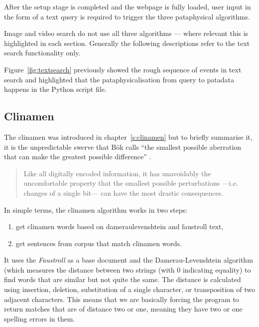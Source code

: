 After the setup stage is completed and the webpage is fully loaded, user input in the form of a text query is required to trigger the three pataphysical algorithms.

Image and video search do not use all three algorithms --- where relevant this is highlighted in each section. Generally the following descriptions refer to the text search functionality only.

Figure~\ref{fig:textsearch} previously showed the rough sequence of events in text search and highlighted that the pataphysicalisation from query to patadata happens in the  Python script file.


\subsection{Clinamen}
\label{s:clinamenalgo}

The clinamen was introduced in chapter~\ref{s:clinamen} but to briefly summarise it, it is the unpredictable swerve that Bök calls ``the smallest possible aberration that can make the greatest possible difference'' \autocite*{Bok2002}.

\begin{quotation}
  Like all digitally encoded information, it has unavoidably the uncomfortable property that the smallest possible perturbations —i.e. changes of a single bit— can have the most drastic consequences. 
\end{quotation}

In simple terms, the clinamen algorithm works in two steps:
\begin{enumerate}
  \item get clinamen words based on dameraulevenshtein and faustroll text,
  \item get sentences from corpus that match clinamen words.
\end{enumerate}

It uses the \textit{Faustroll} \autocite{Jarry1996} as a base document and the Damerau-Leven\-shtein algorithm \autocite{Damerau1964, Levenshtein1966} (which measures the distance between two strings (with 0 indicating equality) to find words that are similar but not quite the same. The distance is calculated using insertion, deletion, substitution of a single character, or transposition of two adjacent characters. This means that we are basically forcing the program to return matches that are of distance two or one, meaning they have two or one spelling errors in them.

